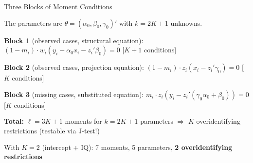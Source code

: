 \documentclass[aspectratio=169, handout, t]{beamer}
\numberwithin{equation}{section}
\begin{document}
\begin{frame}{Three Blocks of Moment Conditions}

The parameters are $\theta = (\alpha_0, \beta_0, \gamma_0)'$ with $k = 2K+1$ unknowns.

\medskip
\textbf{Block 1} (observed cases, structural equation):
$(1-m_i)\cdot w_i(y_i - \alpha_0 x_i - z_i'\beta_0) = 0$ \hfill [$K+1$ conditions]

\textbf{Block 2} (observed cases, projection equation):
$(1-m_i)\cdot z_i(x_i - z_i'\gamma_0) = 0$ \hfill [$K$ conditions]

\textbf{Block 3} (missing cases, substituted equation):
$m_i \cdot z_i(y_i - z_i'(\gamma_0\alpha_0 + \beta_0)) = 0$ \hfill [$K$ conditions]

\medskip
\textbf{Total:} $\ell = 3K + 1$ moments for $k = 2K + 1$ parameters $\Rightarrow$ $K$ \alert{overidentifying restrictions} (testable via J-test!)

\smallskip
With $K = 2$ (intercept + IQ): 7 moments, 5 parameters, \textbf{2 overidentifying restrictions}

\end{frame}
\end{document}

